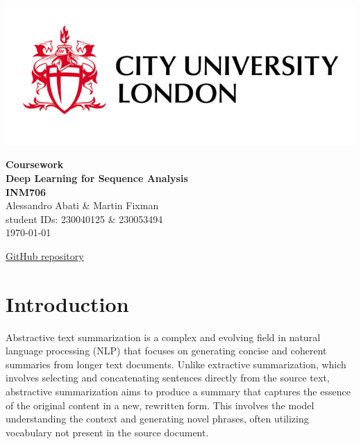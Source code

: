 \documentclass[a4paper, 11pt]{article}
\begin{document}
\begin{titlepage}
    \begin{minipage}{0.5\textwidth}
        \vspace{-2cm}
        \hspace{-1cm}
        \includegraphics[width=1\textwidth]{uni_logo.jpg}
    \end{minipage}
    \begin{center}
        \vspace{6cm}
        \begin{minipage}{0.7\textwidth}
        \centering
        {\huge\bfseries Coursework \vspace{10pt}\\ Deep Learning for Sequence Analysis  \vspace{10pt} \\ INM706}\\[2ex]
        \vspace{15pt}
        {\LARGE Alessandro Abati \& Martin Fixman}\\[1ex]
        {\large student IDs: 230040125 \& 230053494}\\[1ex]
        {\Large \today}
        \end{minipage}
    \end{center}
    \begin{center}
        {\Large \href{https://github.com/mfixman/ai-sequential}{GitHub repository}}
    \end{center}
\end{titlepage}

\newpage
\thispagestyle{empty}
\tableofcontents

\newpage
\thispagestyle{empty}
\section*{Introduction}
Abstractive text summarization is a complex and evolving field in natural language processing (NLP) that focuses on generating concise and coherent summaries from longer text documents. Unlike extractive summarization, which involves selecting and concatenating sentences directly from the source text, abstractive summarization aims to produce a summary that captures the essence of the original content in a new, rewritten form. This involves the model understanding the context and generating novel phrases, often utilizing vocabulary not present in the source document.
\end{document}
